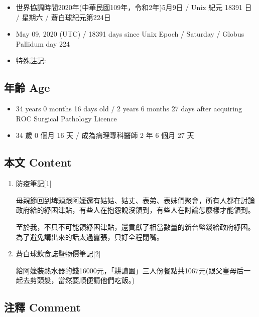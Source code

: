 \documentclass[a5paper, 11pt
]{book}
\providecommand{\tightlist}{%
  \setlength{\itemsep}{0pt}\setlength{\parskip}{0pt}}
\begin{document}
\begin{itemize}
\tightlist
\item
  世界協調時間2020年(中華民國109年，令和2年)5月9日 / Unix 紀元 18391 日
  / 星期六 / 蒼白球紀元第224日
\item
  May 09, 2020 (UTC) / 18391 days since Unix Epoch / Saturday / Globus
  Pallidum day 224
\item
  特殊註記:
\end{itemize}

\hypertarget{ux5e74ux9f61-age-69}{%
\subsection{年齡 Age}\label{ux5e74ux9f61-age-69}}

\begin{itemize}
\tightlist
\item
  34 years 0 months 16 days old / 2 years 6 months 27 days after
  acquiring ROC Surgical Pathology Licence
\item
  34 歲 0 個月 16 天 / 成為病理專科醫師 2 年 6 個月 27 天
\end{itemize}

\hypertarget{ux672cux6587-content-69}{%
\subsection{本文 Content}\label{ux672cux6587-content-69}}

\begin{enumerate}
\def\labelenumi{\arabic{enumi}.}
\item
  防疫筆記{[}1{]}

  母親節回到埤頭跟阿嬤還有姑姑、姑丈、表弟、表妹們聚會，所有人都在討論政府給的紓困津貼，有些人在抱怨說沒領到，有些人在討論怎麼樣才能領到。

  至於我，不只不可能領紓困津貼，還貢獻了相當數量的新台幣錢給政府紓困。為了避免講出來的話太過囂張，只好全程閉嘴。
\item
  蒼白球飲食誌暨物價筆記{[}2{]}

  給阿嬤裝熱水器的錢16000元，「耕讀園」三人份餐點共1067元(跟父皇母后一起去剪頭髮，當然要順便請他們吃飯。)
\end{enumerate}

\hypertarget{ux6ce8ux91cb-comment-69}{%
\subsection{注釋 Comment}\label{ux6ce8ux91cb-comment-69}}
\end{document}

